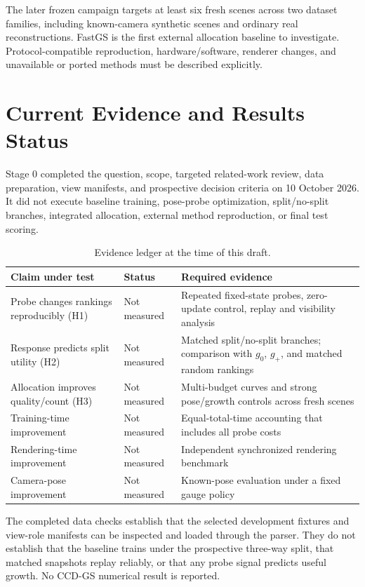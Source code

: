 \documentclass[10pt]{article}
\begin{document}
The later frozen campaign targets at least six fresh scenes across two
dataset families, including known-camera synthetic scenes and ordinary real
reconstructions. FastGS is the first external allocation baseline to
investigate. Protocol-compatible reproduction, hardware/software, renderer
changes, and unavailable or ported methods must be described explicitly.

\section{Current Evidence and Results Status}

Stage 0 completed the question, scope, targeted related-work review, data
preparation, view manifests, and prospective decision criteria on 10 October
2026. It did not execute baseline training, pose-probe optimization,
split/no-split branches, integrated allocation, external method reproduction,
or final test scoring.

\begin{table}[htbp]
\centering
\small
\begin{tabularx}{\linewidth}{@{}l l Y@{}}
\toprule
\textbf{Claim under test} & \textbf{Status} & \textbf{Required evidence}\\
\midrule
Probe changes rankings reproducibly (H1) & Not measured &
Repeated fixed-state probes, zero-update control, replay and visibility analysis\\
Response predicts split utility (H2) & Not measured &
Matched split/no-split branches; comparison with \(g_0\), \(g_+\), and matched random rankings\\
Allocation improves quality/count (H3) & Not measured &
Multi-budget curves and strong pose/growth controls across fresh scenes\\
Training-time improvement & Not measured &
Equal-total-time accounting that includes all probe costs\\
Rendering-time improvement & Not measured &
Independent synchronized rendering benchmark\\
Camera-pose improvement & Not measured &
Known-pose evaluation under a fixed gauge policy\\
\bottomrule
\end{tabularx}
\caption{Evidence ledger at the time of this draft.}
\label{tab:evidence}
\end{table}

The completed data checks establish that the selected development fixtures
and view-role manifests can be inspected and loaded through the parser. They
do not establish that the baseline trains under the prospective three-way
split, that matched snapshots replay reliably, or that any probe signal
predicts useful growth. No CCD-GS numerical result is reported.
\end{document}
